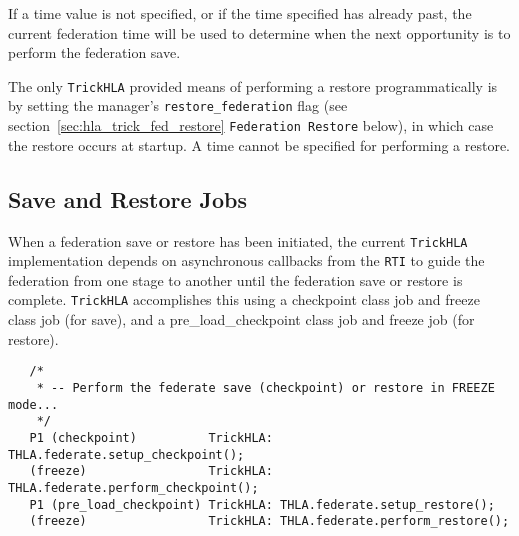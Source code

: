 If a time value is not specified, or if the time specified has already past,
the current federation time will be used to determine when the next opportunity is to perform the
federation save.

The only {\tt TrickHLA} provided means of performing a restore programmatically is by setting the manager's {\tt restore\_federation} flag
(see section~\ref{sec:hla_trick_fed_restore} {\tt Federation Restore} below), in which case the restore occurs at startup.
A time cannot be specified for performing a restore.

\subsection{Save and Restore Jobs}

When a federation save or restore has been initiated, the current {\tt TrickHLA} implementation depends
on asynchronous callbacks from the {\tt RTI} to guide the federation from one stage to another until the federation
save or restore is complete. {\tt TrickHLA} accomplishes this using a checkpoint class job and freeze class job (for save),
and a pre\_load\_checkpoint class job and freeze job (for restore).

\begin{verbatim}
   /*
    * -- Perform the federate save (checkpoint) or restore in FREEZE mode...
    */
   P1 (checkpoint)          TrickHLA: THLA.federate.setup_checkpoint();
   (freeze)                 TrickHLA: THLA.federate.perform_checkpoint();
   P1 (pre_load_checkpoint) TrickHLA: THLA.federate.setup_restore();
   (freeze)                 TrickHLA: THLA.federate.perform_restore();
\end{verbatim}



